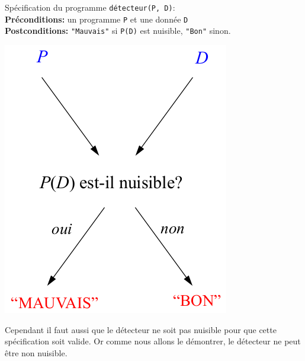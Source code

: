 \noindent Spécification du programme \lstinline|détecteur(P, D)|:\\
\textbf{Préconditions:} un programme \lstinline|P| et une donnée \lstinline|D|\\
\textbf{Postconditions:} \lstinline|"Mauvais"| si \lstinline|P(D)| est nuisible, \lstinline|"Bon"| sinon.

\begin{center}
\includegraphics[scale=0.45]{Images/effet_detecteur.png}
\end{center}

Cependant il faut aussi que le détecteur ne soit pas nuisible pour que cette spécification soit valide. Or comme nous allons le démontrer, le détecteur ne peut être non nuisible.

